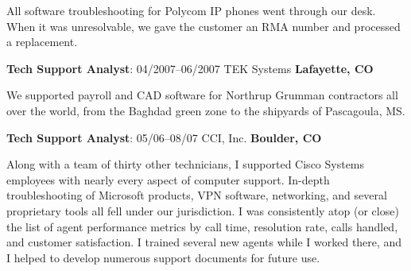 \documentclass[letterpaper,12pt]{article}
\begin{document}
All software troubleshooting for Polycom IP phones went through our desk. When
it was unresolvable, we gave the customer an RMA number and processed a
replacement.

\begin{flushleft}
\textbf{Tech Support Analyst}: 04/2007--06/2007 TEK Systems 
\textbf{Lafayette, CO}
\end{flushleft}

We supported payroll and CAD software for Northrup Grumman contractors all over
the world, from the Baghdad green zone to the shipyards of Pascagoula, MS.

\begin{flushleft}
\textbf{Tech Support Analyst}: 05/06--08/07 CCI, Inc. \textbf{Boulder, CO}
\end{flushleft}

Along with a team of thirty other technicians, I supported Cisco Systems
employees with nearly every aspect of computer support. In-depth
troubleshooting of Microsoft products, VPN software, networking, and several
proprietary tools all fell under our jurisdiction. I was consistently atop
(or close) the list of agent performance metrics by call time, resolution rate,
calls handled, and customer satisfaction. I trained several new agents while
I worked there, and I helped to develop numerous support documents for future
use.
\end{document}
